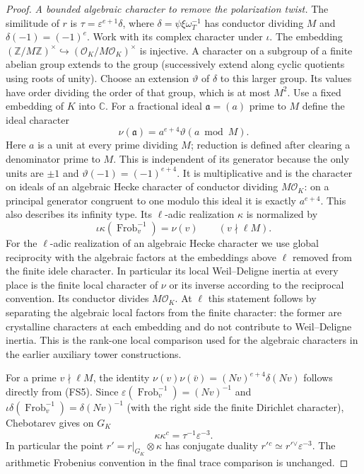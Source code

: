 \begin{proof}
\emph{A bounded algebraic character to remove the polarization twist.}
The similitude of \(r\) is
\(\tau=\varepsilon^{e+1}\delta\), where
\(\delta=\psi\xi\omega_T^{-1}\) has conductor dividing \(M\) and
\(\delta(-1)=(-1)^e\). Work with its complex character under
\(\iota\). The embedding
\((\mathbb Z/M\mathbb Z)^\times\hookrightarrow
(\mathcal O_K/M\mathcal O_K)^\times\) is injective.
A character on a subgroup of a finite abelian group extends
to the group (successively extend along cyclic quotients
using roots of unity). Choose an extension \(\vartheta\)
of \(\delta\) to this larger group. Its values have order
dividing the order of that group, which is at most \(M^2\).
Use a fixed embedding of \(K\) into \(\mathbb C\).
For a fractional ideal \(\mathfrak a=(a)\) prime to \(M\)
define the ideal character
\[
                 \nu(\mathfrak a)=a^{e+4}\vartheta(a\bmod M).
                                                               \tag{FS5}
\]
Here \(a\) is a unit at every prime dividing \(M\); reduction
is defined after clearing a denominator prime to \(M\).
This is independent of its generator because the only
units are \(\pm1\) and
\(\vartheta(-1)=(-1)^{e+4}\).
It is multiplicative and is the character on ideals of an
algebraic Hecke character of conductor dividing \(M\mathcal O_K\):
on a principal generator congruent to one modulo this ideal
it is exactly \(a^{e+4}\).
This also describes its infinity type. Its \(\ell\)-adic
realization \(\kappa\) is normalized by
\[
                 \iota\kappa(\operatorname{Frob}_v^{-1})
                        =\nu(v)\qquad(v\nmid \ell M).
\]
For the \(\ell\)-adic realization of an algebraic Hecke
character we use global reciprocity with the algebraic factors
at the embeddings above \(\ell\) removed from the finite
idele character. In particular its local Weil--Deligne
inertia at every place is the finite local character of
\(\nu\) or its inverse according to the reciprocal convention.
Its conductor divides \(M\mathcal O_K\). At \(\ell\) this
statement follows by separating the algebraic local factors
from the finite character: the former are crystalline
characters at each embedding and do not contribute to
Weil--Deligne inertia. This is the rank-one local comparison
used for the algebraic characters in the earlier auxiliary
tower constructions.

For a prime \(v\nmid \ell M\), the identity
\(\nu(v)\nu(\bar v)=(Nv)^{e+4}\delta(Nv)\)
follows directly from (FS5).
Since \(\varepsilon(\operatorname{Frob}_v^{-1})=(Nv)^{-1}\)
and \(\iota\delta(\operatorname{Frob}_v^{-1})=\delta(Nv)^{-1}\)
(with the right side the finite Dirichlet character), Chebotarev
gives on \(G_K\)
\[
                  \kappa\kappa^c=\tau^{-1}\varepsilon^{-3}.
                                                               \tag{FS6}
\]
In particular the point \(r'=r|_{G_K}\otimes\kappa\)
has conjugate duality \(r'{}^c\simeq r'{}^\vee\varepsilon^{-3}\).
The arithmetic Frobenius convention in the final trace
comparison is unchanged.


\end{proof}
